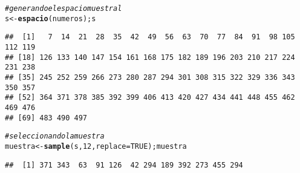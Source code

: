 \documentclass{article}\usepackage[]{graphicx}\usepackage[]{color}
\makeatletter
\newcommand{\hlnum}[1]{\textcolor[rgb]{0.686,0.059,0.569}{#1}}%
\newcommand{\hlcom}[1]{\textcolor[rgb]{0.678,0.584,0.686}{\textit{#1}}}%
\newcommand{\hlstd}[1]{\textcolor[rgb]{0.345,0.345,0.345}{#1}}%
\newcommand{\hlkwb}[1]{\textcolor[rgb]{0.69,0.353,0.396}{#1}}%
\newcommand{\hlkwc}[1]{\textcolor[rgb]{0.333,0.667,0.333}{#1}}%
\newcommand{\hlkwd}[1]{\textcolor[rgb]{0.737,0.353,0.396}{\textbf{#1}}}%
\newenvironment{kframe}{%
 \def\at@end@of@kframe{}%
 \ifinner\ifhmode%
  \def\at@end@of@kframe{\end{minipage}}%
  \begin{minipage}{\columnwidth}%
 \fi\fi%
 \def\FrameCommand##1{\hskip\@totalleftmargin \hskip-\fboxsep
 \colorbox{shadecolor}{##1}\hskip-\fboxsep
     \hskip-\linewidth \hskip-\@totalleftmargin \hskip\columnwidth}%
 \MakeFramed {\advance\hsize-\width
   \@totalleftmargin\z@ \linewidth\hsize
   \@setminipage}}%
 {\par\unskip\endMakeFramed%
 \at@end@of@kframe}
\newenvironment{knitrout}{}{} %
\makeatother
\begin{document}
\begin{knitrout}
\begin{kframe}
\begin{alltt}
\hlcom{# generando el espacio muestral}
\hlstd{s} \hlkwb{<-} \hlkwd{espacio}\hlstd{(numeros); s}
\end{alltt}
\begin{verbatim}
##  [1]   7  14  21  28  35  42  49  56  63  70  77  84  91  98 105 112 119
## [18] 126 133 140 147 154 161 168 175 182 189 196 203 210 217 224 231 238
## [35] 245 252 259 266 273 280 287 294 301 308 315 322 329 336 343 350 357
## [52] 364 371 378 385 392 399 406 413 420 427 434 441 448 455 462 469 476
## [69] 483 490 497
\end{verbatim}
\begin{alltt}
\hlcom{# seleccionando la muestra}
\hlstd{muestra} \hlkwb{<-} \hlkwd{sample}\hlstd{(s,} \hlnum{12}\hlstd{,} \hlkwc{replace}\hlstd{=}\hlnum{TRUE}\hlstd{); muestra}
\end{alltt}
\begin{verbatim}
##  [1] 371 343  63  91 126  42 294 189 392 273 455 294
\end{verbatim}
\end{kframe}
\end{knitrout}
\end{document}
